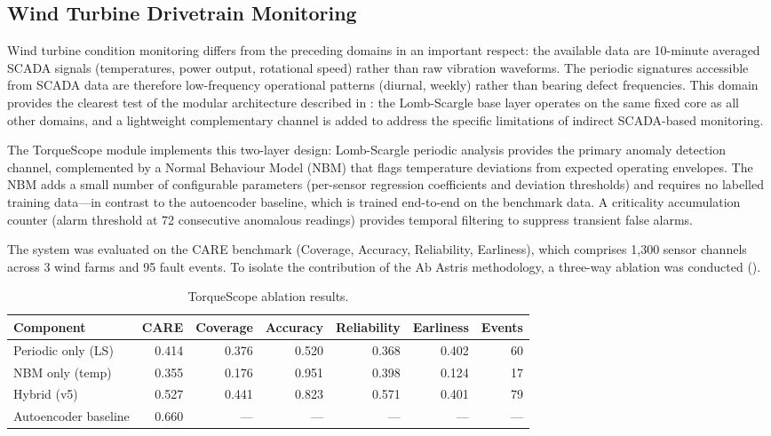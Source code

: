 \documentclass[11pt,a4paper]{article}
\begin{document}
\subsection{Wind Turbine Drivetrain Monitoring}
\label{sec:wind}

Wind turbine condition monitoring differs from the preceding domains in an important respect: the available data are 10-minute averaged SCADA signals (temperatures, power output, rotational speed) rather than raw vibration waveforms. The periodic signatures accessible from SCADA data are therefore low-frequency operational patterns (diurnal, weekly) rather than bearing defect frequencies. This domain provides the clearest test of the modular architecture described in : the Lomb-Scargle base layer operates on the same fixed core as all other domains, and a lightweight complementary channel is added to address the specific limitations of indirect SCADA-based monitoring.

The TorqueScope module implements this two-layer design: Lomb-Scargle periodic analysis provides the primary anomaly detection channel, complemented by a Normal Behaviour Model (NBM) that flags temperature deviations from expected operating envelopes. The NBM adds a small number of configurable parameters (per-sensor regression coefficients and deviation thresholds) and requires no labelled training data---in contrast to the autoencoder baseline, which is trained end-to-end on the benchmark data. A criticality accumulation counter (alarm threshold at 72 consecutive anomalous readings) provides temporal filtering to suppress transient false alarms.

The system was evaluated on the CARE benchmark (Coverage, Accuracy, Reliability, Earliness), which comprises 1{,}300 sensor channels across 3 wind farms and 95 fault events. To isolate the contribution of the Ab Astris methodology, a three-way ablation was conducted ().

\begin{table}[htbp]
\centering
\caption{TorqueScope ablation results.}
\label{tab:care}
\smallskip
\begin{tabular}{lrrrrrr}
\toprule
\textbf{Component} & \textbf{CARE} & \textbf{Coverage} & \textbf{Accuracy} & \textbf{Reliability} & \textbf{Earliness} & \textbf{Events} \\
\midrule
Periodic only (LS)  & 0.414 & 0.376 & 0.520 & 0.368 & 0.402 & 60 \\
NBM only (temp)     & 0.355 & 0.176 & 0.951 & 0.398 & 0.124 & 17 \\
Hybrid (v5)         & 0.527 & 0.441 & 0.823 & 0.571 & 0.401 & 79 \\
Autoencoder baseline & 0.660 & ---  & ---   & ---   & ---   & --- \\
\bottomrule
\end{tabular}
\end{table}
\end{document}
